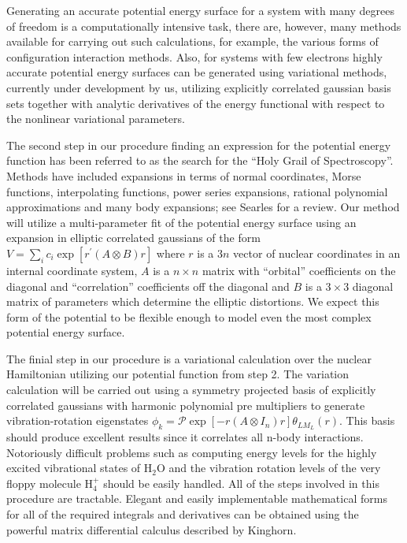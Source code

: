 \documentclass[12pt,thmsa]{article}
\begin{document}
Generating an accurate potential energy surface for a system with many
degrees of freedom is a computationally intensive task, there are, however,
many methods available for carrying out such calculations, for example, the
various forms of configuration interaction methods. Also, for systems with
few electrons highly accurate potential energy surfaces can be generated
using variational methods, currently under development by us, utilizing
explicitly correlated gaussian basis sets together with analytic derivatives
of the energy functional with respect to the nonlinear variational
parameters.

The second step in our procedure finding an expression for the potential
energy function has been referred to as the search for the ``Holy Grail of
Spectroscopy''. Methods have included expansions in terms of normal
coordinates, Morse functions, interpolating functions, power series
expansions, rational polynomial approximations and many body expansions; see
Searles\cite{Searles93} for a review. Our method will utilize a
multi-parameter fit of the potential energy surface using an expansion in
elliptic correlated gaussians of the form $V=\sum_ic_i\exp \left[ r^{\prime
}\left( A\otimes B\right) r\right] $ where $r$ is a $3n$ vector of nuclear
coordinates in an internal coordinate system, $A$ is a $n\times n$ matrix
with ``orbital'' coefficients on the diagonal and ``correlation''
coefficients off the diagonal and $B$ is a $3\times 3$ diagonal matrix of
parameters which determine the elliptic distortions. We expect this form of
the potential to be flexible enough to model even the most complex potential
energy surface.

The finial step in our procedure is a variational calculation over the
nuclear Hamiltonian utilizing our potential function from step 2. The
variation calculation will be carried out using a symmetry projected basis
of explicitly correlated gaussians with harmonic polynomial pre multipliers
to generate vibration-rotation eigenstates $\phi _k=\mathcal{P}\exp
[-r\left( A\otimes I_n\right) r]\theta _{LM_L}\left( r\right) $. This basis
should produce excellent results since it correlates all n-body
interactions. Notoriously difficult problems such as computing energy levels
for the highly excited vibrational states of H$_2$O and the vibration
rotation levels of the very floppy molecule H$_4^{+}$ should be easily
handled. All of the steps involved in this procedure are tractable. Elegant
and easily implementable mathematical forms for all of the required
integrals and derivatives can be obtained using the powerful matrix
differential calculus described by Kinghorn\cite{Kinghorn95}.
\end{document}
